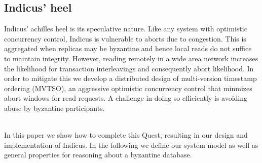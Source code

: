 \subsection{Indicus' heel}
Indicus' achilles heel is its speculative nature. Like any system with optimistic concurrency control, Indicus is vulnerable to aborts due to congestion. This is aggregated when replicas may be byzantine and hence local reads do not suffice to maintain integrity. However, reading remotely in a wide area network increases the likelihood for transaction interleavings and consequently abort likelihood. In order to mitigate this we develop a distributed design of multi-version timestamp ordering (MVTSO), an aggressive optimistic concurrency control that minmizes abort windows for read requests. A challenge in doing so efficiently is avoiding abuse by byzantine participants. 

\\



In this paper we show how to complete this Quest, resulting in our design and implementation of Indicus. In the following we define our system model as well as general properties for reasoning about a byzantine database.